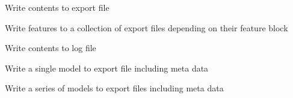 \documentclass[letterpaper,10pt,english]{sphinxmanual}
\begin{document}

\begin{fulllineitems}
\label{index:flamingo.filesys.write_export_file}
Write contents to export file

\end{fulllineitems}


\begin{fulllineitems}
\label{index:flamingo.filesys.write_feature_files}
Write features to a collection of export files depending on their feature block

\end{fulllineitems}


\begin{fulllineitems}
\label{index:flamingo.filesys.write_log_file}
Write contents to log file

\end{fulllineitems}


\begin{fulllineitems}
\label{index:flamingo.filesys.write_model_file}
Write a single model to export file including meta data

\end{fulllineitems}


\begin{fulllineitems}
\label{index:flamingo.filesys.write_model_files}
Write a series of models to export files including meta data

\end{fulllineitems}
\end{document}
